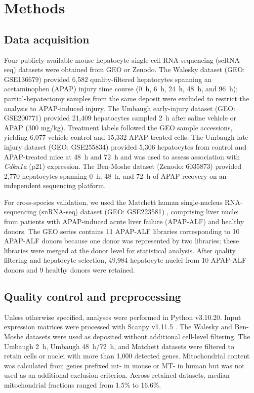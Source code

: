 \section*{Methods}\label{sec:methods}

\subsection*{Data acquisition}

Four publicly available mouse hepatocyte single-cell RNA-sequencing (scRNA-seq) datasets were obtained from GEO or Zenodo. The Walesky dataset (GEO: GSE136679) \cite{ref010} provided 6,582 quality-filtered hepatocytes spanning an acetaminophen (APAP) injury time course (0~h, 6~h, 24~h, 48~h, and 96~h); partial-hepatectomy samples from the same deposit were excluded to restrict the analysis to APAP-induced injury. The Umbaugh early-injury dataset (GEO: GSE200771) \cite{ref009} provided 21,409 hepatocytes sampled 2~h after saline vehicle or APAP (300 mg/kg). Treatment labels followed the GEO sample accessions, yielding 6,077 vehicle-control and 15,332 APAP-treated cells. The Umbaugh late-injury dataset (GEO: GSE255834) \cite{ref061} provided 5,306 hepatocytes from control and APAP-treated mice at 48~h and 72~h and was used to assess association with \textit{Cdkn1a} (p21) expression. The Ben-Moshe dataset (Zenodo: 6035873) \cite{ref011} provided 2,770 hepatocytes spanning 0~h, 48~h, and 72~h of APAP recovery on an independent sequencing platform.

For cross-species validation, we used the Matchett human single-nucleus RNA-sequencing (snRNA-seq) dataset (GEO: GSE223581) \cite{ref019}, comprising liver nuclei from patients with APAP-induced acute liver failure (APAP-ALF) and healthy donors. The GEO series contains 11 APAP-ALF libraries corresponding to 10 APAP-ALF donors because one donor was represented by two libraries; these libraries were merged at the donor level for statistical analysis. After quality filtering and hepatocyte selection, 49,984 hepatocyte nuclei from 10 APAP-ALF donors and 9 healthy donors were retained.

\subsection*{Quality control and preprocessing}

Unless otherwise specified, analyses were performed in Python v3.10.20. Input expression matrices were processed with Scanpy v1.11.5 \cite{ref109}. The Walesky and Ben-Moshe datasets were used as deposited without additional cell-level filtering. The Umbaugh 2~h, Umbaugh 48~h/72~h, and Matchett datasets were filtered to retain cells or nuclei with more than 1,000 detected genes. Mitochondrial content was calculated from genes prefixed mt- in mouse or MT- in human but was not used as an additional exclusion criterion. Across retained datasets, median mitochondrial fractions ranged from 1.5\% to 16.6\%.

